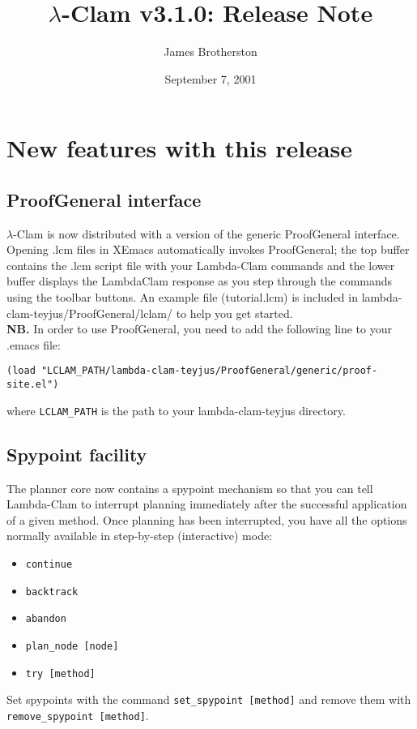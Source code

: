 \documentclass[11pt]{article}
\begin{document}
\title{$\lambda$-Clam v3.1.0: Release Note} 

\author{James Brotherston}

\date{September 7, 2001}

\maketitle

\section{New features with this release}

\subsection{ProofGeneral interface}

$\lambda$-Clam is now distributed with a version of the generic
ProofGeneral interface.  Opening .lcm files in XEmacs automatically
invokes ProofGeneral; the top buffer contains the .lcm script file
with your Lambda-Clam commands and the lower buffer displays the
LambdaClam response as you step through the commands using the toolbar
buttons.  An example file (tutorial.lcm) is
included in lambda-clam-teyjus/ProofGeneral/lclam/ to help you get started. \\

\noindent\textbf{NB.} In order to use ProofGeneral, you need to add the
following line to your .emacs file: 

\noindent\texttt{(load "LCLAM\_PATH/lambda-clam-teyjus/ProofGeneral/generic/proof-site.el")} 

\noindent where \texttt{LCLAM\_PATH} is the path to your lambda-clam-teyjus 
directory.

\subsection{Spypoint facility}

The planner core now contains a spypoint mechanism so that you can
tell Lambda-Clam to interrupt planning immediately after the
successful application of a given method.  Once planning has been
interrupted, you have all the options normally available in
step-by-step (interactive) mode:
\begin{itemize}
\item \texttt{continue}
\item \texttt{backtrack}
\item \texttt{abandon}
\item \texttt{plan\_node [node]}
\item \texttt{try [method]}
\end{itemize}
\noindent Set spypoints with the command \texttt{set\_spypoint [method]} 
and remove them with \texttt{remove\_spypoint [method]}.
\end{document}
